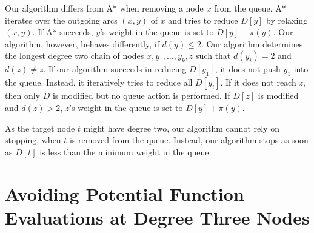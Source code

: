 \documentclass[a4paper,UKenglish,cleveref, autoref]{lipics-v2019}
\begin{document}
Our algorithm differs from A* when removing a node $x$ from the queue.
A* iterates over the outgoing arcs $(x,y)$ of $x$ and tries to reduce $D[y]$ by relaxing $(x,y)$.
If A* succeeds, $y$'s weight in the queue is set to $D[y]+\pi(y)$.
Our algorithm, however, behaves differently, if $d(y)\le 2$.
Our algorithm determines the longest degree two chain of nodes $x,y_1,\ldots, y_k, z$ such that $d(y_i)=2$ and $d(z)\neq z$.
If our algorithm succeeds in reducing $D[y_1]$, it does not push $y_1$ into the queue.
Instead, it iteratively tries to reduce all $D[y_i]$.
If it does not reach $z$, then only $D$ is modified but no queue action is performed.
If $D[z]$ is modified and $d(z)>2$, $z$'s weight in the queue is set to $D[y]+\pi(y)$.

As the target node $t$ might have degree two, our algorithm cannot rely on stopping, when $t$ is removed from the queue.
Instead, our algorithm stops as soon as $D[t]$ is less than the minimum weight in the queue.

\section{Avoiding Potential Function Evaluations at Degree Three Nodes}
\end{document}
